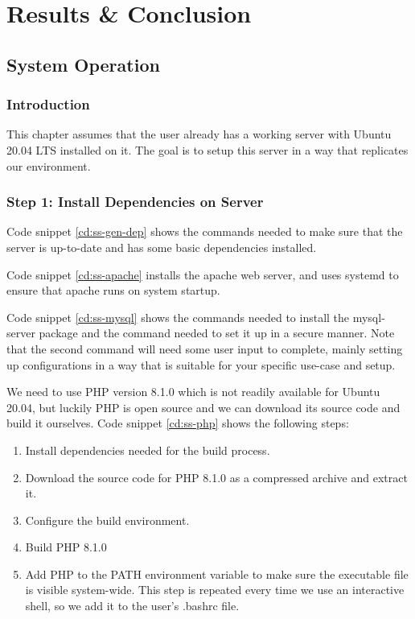 \part{Results \& Conclusion}
\chapter{System Operation}
\label{ch:res-conc}
\section{Introduction}
This chapter assumes that the user already has a working server with Ubuntu 20.04 LTS installed on it. The goal is to setup this server in a way that replicates our environment.
\section{Step 1: Install Dependencies on Server}
Code snippet \ref{cd:ss-gen-dep} shows the commands needed to make sure that the server is up-to-date and has some basic dependencies installed.


Code snippet \ref{cd:ss-apache} installs the apache web server, and uses systemd to ensure that apache runs on system startup.


Code snippet \ref{cd:ss-mysql} shows the commands needed to install the mysql-server package and the command needed to set it up in a secure manner. Note that the second command will need some user input to complete, mainly setting up configurations in a way that is suitable for your specific use-case and setup.
\newpage


We need to use PHP version 8.1.0 which is not readily available for Ubuntu 20.04, but luckily PHP is open source and we can download its source code and build it ourselves. Code snippet \ref{cd:ss-php} shows the following steps:
\begin{enumerate}
	\item Install dependencies needed for the build process.
	\item Download the source code for PHP 8.1.0 as a compressed archive and extract it.
	\item Configure the build environment.
	\item Build PHP 8.1.0
	\item Add PHP to the PATH environment variable to make sure the executable file is visible system-wide. This step is repeated every time we use an interactive shell, so we add it to the user's .bashrc file.
\end{enumerate}


